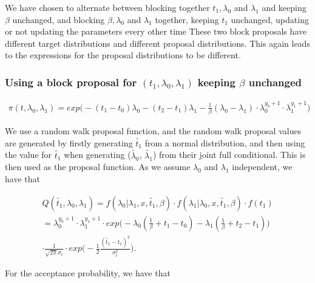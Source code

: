 
We have chosen to alternate between blocking together $t_1, \lambda_0$ and  $ \lambda_1$ and keeping $\beta$ unchanged, and blocking $\beta, \lambda_0$ and $\lambda_1$ together, keeping $t_1$ unchanged, updating or not updating the parameters every other time These two block proposals have different target distributions and different proposal distributions. This again leads to the expressions for the proposal distributions to be different.


\subsubsection{Using a block proposal for $(t_1, \lambda_0, \lambda_1)$ keeping $\beta$ unchanged}

\begin{align}
    \pi(t, \lambda_0, \lambda_1) = exp \Big( -(t_1-t_0)\lambda_0 -(t_2-t_1)\lambda_1 - \frac{1}{\beta}(\lambda_0 - \lambda_1) \cdot\lambda_0^{y_0 + 1} \cdot \lambda_1^{y_1 + 1} \Big)
\end{align}

We use a random walk proposal function, and the random walk proposal values are generated by firstly generating $\widetilde{t_1}$ from a normal distribution, and then using the value for $\widetilde{t_1}$ when generating ($\widetilde{\lambda_0}$, $\widetilde{\lambda_1}$) from their joint full conditional. This is then used as the proposal function. As we assume $\lambda_0$ and $\lambda_1$ independent, we have that 

\begin{align}
    Q(\widetilde{t_1}, \lambda_0, \lambda_1) = f(\lambda_0| \lambda_1, x, \widetilde{t_1}, \beta)\cdot f(\lambda_1| \lambda_0, x, \widetilde{t_1}, \beta)\cdot f(t_1) \nonumber \\
    = \lambda_0^{y_0 + 1} \cdot \lambda_1^{y_1 + 1} \cdot exp \Big(  -\lambda_0(\frac{1}{\beta} + t_1 - t_0) - \lambda_1(\frac{1}{\beta} + t_2 - t_1)  \Big)  \nonumber \\ \cdot \frac{1}{\sqrt{2 \pi}\sigma_t } \cdot exp \Big(  -\frac{1}{2} \frac{(\widetilde{t_1}-t_1)^2}{\sigma_t^2} \Big).
\end{align}



For the acceptance probability, we have that

